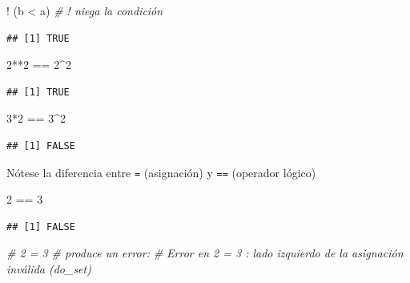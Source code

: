 \documentclass[
]{book}
\newenvironment{Shaded}{\begin{snugshade}}{\end{snugshade}}
\newcommand{\CommentTok}[1]{\textcolor[rgb]{0.56,0.35,0.01}{\textit{#1}}}
\newcommand{\DecValTok}[1]{\textcolor[rgb]{0.00,0.00,0.81}{#1}}
\newcommand{\NormalTok}[1]{#1}
\newcommand{\SpecialCharTok}[1]{\textcolor[rgb]{0.00,0.00,0.00}{#1}}
\theoremstyle{break}
\theoremstyle{nonumberplain}
\begin{document}
\begin{Shaded}
\begin{Highlighting}[]
\SpecialCharTok{!}\NormalTok{ (b }\SpecialCharTok{\textless{}}\NormalTok{ a) }\CommentTok{\# ! niega la condición}
\end{Highlighting}
\end{Shaded}

\begin{verbatim}
## [1] TRUE
\end{verbatim}

\begin{Shaded}
\begin{Highlighting}[]
\DecValTok{2}\SpecialCharTok{**}\DecValTok{2} \SpecialCharTok{==} \DecValTok{2}\SpecialCharTok{\^{}}\DecValTok{2}
\end{Highlighting}
\end{Shaded}

\begin{verbatim}
## [1] TRUE
\end{verbatim}

\begin{Shaded}
\begin{Highlighting}[]
\DecValTok{3}\SpecialCharTok{*}\DecValTok{2} \SpecialCharTok{==} \DecValTok{3}\SpecialCharTok{\^{}}\DecValTok{2}
\end{Highlighting}
\end{Shaded}

\begin{verbatim}
## [1] FALSE
\end{verbatim}

Nótese la diferencia entre \texttt{=} (asignación) y \texttt{==} (operador lógico)

\begin{Shaded}
\begin{Highlighting}[]
\DecValTok{2} \SpecialCharTok{==} \DecValTok{3}
\end{Highlighting}
\end{Shaded}

\begin{verbatim}
## [1] FALSE
\end{verbatim}

\begin{Shaded}
\begin{Highlighting}[]
\CommentTok{\# 2 = 3 \# produce un error:}
\CommentTok{\# Error en 2 = 3 : lado izquierdo de la asignación inválida (do\_set)}
\end{Highlighting}
\end{Shaded}
\end{document}
